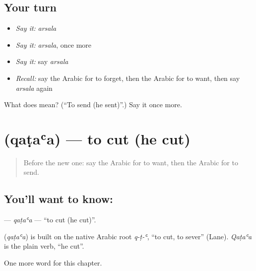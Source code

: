 \subsection*{Your turn}
\begin{itemize}
\raggedright
  \item \emph{Say it:} \emph{arsala}
  \item \emph{Say it:} \emph{arsala}, once more
  \item \emph{Say it:} say \emph{arsala}
  \item \emph{Recall:} say the Arabic for to forget, then the Arabic for to want, then say \emph{arsala} again
\end{itemize}

\begin{tcolorbox}[breakable,colback=teal!4,colframe=teal!35!black,title={Before you move on}]
What does  mean? (\textquotedblleft{}To send (he sent)\textquotedblright{}.) Say it once more.
\end{tcolorbox}
\section[\texorpdfstring{\ar{قطع} (qaṭaʿa)}{قطع (qaṭaʿa)}]{ (qaṭaʿa) — to cut (he cut)}

\label{lesson:AR-C61-qataa}



\begin{quote}
Before the new one: say the Arabic for to want, then the Arabic for to send.
\end{quote}

\subsection*{You'll want to know: }
\textbf{} — \emph{qaṭaʿa} — \textquotedblleft{}to cut (he cut)\textquotedblright{}.

\begin{cousinweb}
\textbf{} (\emph{qaṭaʿa}) is built on the native Arabic root \emph{q-ṭ-ʿ}, \textquotedblleft{}to cut, to sever\textquotedblright{} (Lane). \emph{Qaṭaʿa} is the plain verb, \textquotedblleft{}he cut\textquotedblright{}.
\end{cousinweb}

\begin{grammarlens}[title={What you've built}]
One more word for this chapter.
\end{grammarlens}

